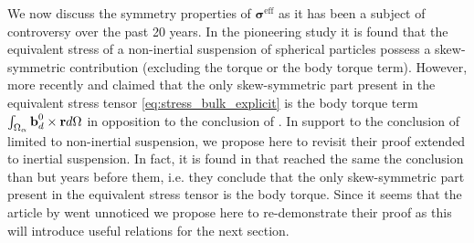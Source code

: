 We now discuss the symmetry properties of $\bm\sigma^\text{eff}$ as it has been a subject of controversy over the past 20 years.
In the pioneering study  \citep{prosperetti2006stress} it is found that the equivalent stress of a non-inertial suspension of spherical particles possess a skew-symmetric contribution (excluding the torque or the body torque term). 
However, more recently \citet{zhou2020lamb} and \citet{dolata2020heterogeneous} claimed that the only skew-symmetric part present in the equivalent stress tensor \eqref{eq:stress_bulk_explicit} is the body torque term $\int_{\Omega_\alpha} \textbf{b}_d^0 \times \textbf{r} d\Omega$ in opposition to the conclusion of \citep{prosperetti2006stress}.
In support to the conclusion of  \citet{dolata2020heterogeneous} limited to non-inertial suspension, we propose here to revisit their proof extended to inertial suspension. 
In fact, it is found in \citet{lhuillier1996contribution} that reached the same the conclusion than \citet{dolata2020heterogeneous} but years before them, i.e. they conclude that the only skew-symmetric part present in the equivalent stress tensor is the body torque. 
Since it seems that the article by \citet{lhuillier1996contribution} went unnoticed we propose here to re-demonstrate their proof as this will introduce useful relations for the next section. 

